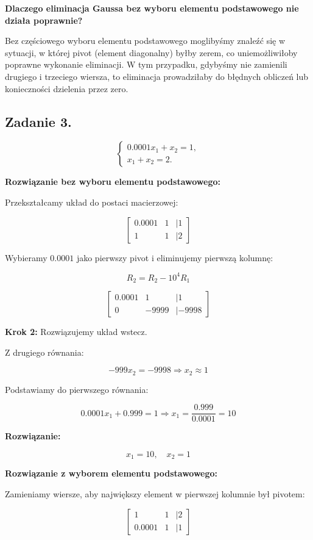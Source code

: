 \documentclass{article}
\begin{document}
\textbf{Dlaczego eliminacja Gaussa bez wyboru elementu podstawowego nie działa poprawnie?}

Bez częściowego wyboru elementu podstawowego moglibyśmy znaleźć się w sytuacji, w której pivot (element diagonalny) byłby zerem, co uniemożliwiłoby poprawne wykonanie eliminacji. W tym przypadku, gdybyśmy nie zamienili drugiego i trzeciego wiersza, to eliminacja prowadziłaby do błędnych obliczeń lub konieczności dzielenia przez zero.

\subsection{Zadanie 3.}

\[
\begin{cases}
0.0001x_1 + x_2 = 1, \\
x_1 + x_2 = 2.
\end{cases}
\]

\textbf{Rozwiązanie bez wyboru elementu podstawowego:}

Przekształcamy układ do postaci macierzowej:

\[
\begin{bmatrix}
0.0001 & 1 & | 1 \\
1 & 1 & | 2
\end{bmatrix}
\]

Wybieramy \( 0.0001 \) jako pierwszy pivot i eliminujemy pierwszą kolumnę:

\[
R_2 = R_2 - 10^4 R_1
\]

\[
\begin{bmatrix}
0.0001 & 1 & | 1 \\
0 & -9999 & | -9998
\end{bmatrix}
\]

\textbf{Krok 2:} Rozwiązujemy układ wstecz.

Z drugiego równania:

\[
-999 x_2 = -9998 \Rightarrow x_2 \approx 1
\]

Podstawiamy do pierwszego równania:

\[
0.0001 x_1 + 0.999 = 1 \Rightarrow x_1 = \frac{0.999}{0.0001} = 10
\]


\textbf{Rozwiązanie:}

\[
x_1 = 10, \quad x_2 = 1
\]

\textbf{Rozwiązanie z wyborem elementu podstawowego:}

Zamieniamy wiersze, aby największy element w pierwszej kolumnie był pivotem:

\[
\begin{bmatrix}
1 & 1 & | 2 \\
0.0001 & 1 & | 1
\end{bmatrix}
\]
\end{document}
